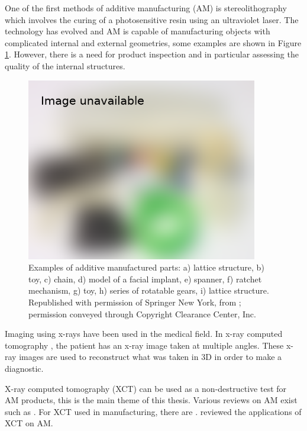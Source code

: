 One of the first methods of additive manufacturing (AM) is stereolithography \citep{kodama1981automatic, hull1986apparatus, 3d2019our} which involves the curing of a photosensitive resin using an ultraviolet laser. The technology has evolved and AM is capable of manufacturing objects with complicated internal and external geometries, some examples are shown in Figure \ref{fig:literature_3dprint}. However, there is a need for product inspection and in particular assessing the quality of the internal structures.

\begin{figure}
  \centering
  \includegraphics[width=0.9\textwidth]{../figures/literatureReview/literature_3dprint.png}
  \caption{Examples of additive manufactured parts: a) lattice structure, b) toy, c) chain, d) model of a facial implant, e) spanner, f) ratchet mechanism, g) toy, h) series of rotatable gears, i) lattice structure. Republished with permission of Springer New York, from \cite{gibson2010additive}; permission conveyed through Copyright
Clearance Center, Inc.}
  \label{fig:literature_3dprint}
\end{figure}

Imaging using x-rays \citep{rontgen1896on} have been used in the medical field. In x-ray computed tomography \citep{cormack1973reconstruction, hounsfield1973computerized, hounsfield1980computed}, the patient has an x-ray image taken at multiple angles. These x-ray images are used to reconstruct what was taken in 3D in order to make a diagnostic.

X-ray computed tomography (XCT) can be used as a non-destructive test for AM products, this is the main theme of this thesis. Various reviews on AM exist such as \cite{kruth1991material, kruth1998progress, pham1998comparison, gibson2010additive, wong2012review, ngo2018additive}. For XCT used in manufacturing, there are \cite{cantatore2011introduction, kruth2011computed, sun2012overview}. \cite{thompson2016x} reviewed the applications of XCT on AM.

